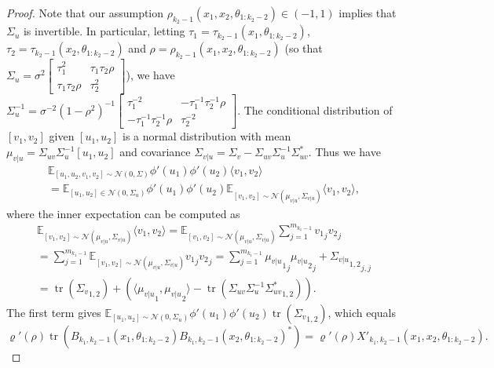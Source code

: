 \documentclass[twoside,11pt]{article}
\newcommand{\E}{\mathbb{E}}
\DeclareMathOperator{\tr}{tr}
\begin{document}
\begin{proof}
Note that our assumption $\rho_{k_2-1}(x_1,x_2,\theta_{1:k_2-2}) \in (-1,1)$ implies that $\Sigma_u$ is invertible. In particular, letting $\tau_1 = \tau_{k_2-1}(x_1, \theta_{1 : k_2-2})$, $\tau_2 = \tau_{k_2-1}(x_2, \theta_{1 : k_2-2})$ and $\rho = \rho_{k_2-1}(x_1,x_2,\theta_{1:k_2-2})$ (so that $\Sigma_u = \sigma^2 \left[ \begin{smallmatrix} \tau_1^2 & \tau_1 \tau_2 \rho \\ \tau_1 \tau_2 \rho & \tau_2^2 \end{smallmatrix} \right]$), we have $\Sigma_u^{-1} = \sigma^{-2} (1-\rho^2)^{-1} \left[ \begin{smallmatrix} \tau_1^{-2} & -\tau_1^{-1} \tau_2^{-1} \rho \\ -\tau_1^{-1} \tau_2^{-1} \rho & \tau_2^{-2} \end{smallmatrix} \right]$. The conditional distribution of $[v_1,v_2]$ given $[u_1,u_2]$ is a normal distribution with mean $\mu_{v \vert u}=\Sigma_{uv} \Sigma_u^{-1} [u_1, u_2]$ and covariance $\Sigma_{v \vert u} = \Sigma_v - \Sigma_{uv} \Sigma_u^{-1} \Sigma_{uv}^*$. Thus we have
\begin{multline*}
\E_{[u_1,u_2,v_1,v_2] \sim \mathcal{N}( 0,\Sigma)} \phi'(u_1) \phi'(u_2) \langle v_1, v_2 \rangle \\
= \E_{[u_1,u_2] \in \mathcal{N}(0,\Sigma_u)}
\phi'(u_1) \phi'(u_2) \E_{[v_1,v_2] \sim \mathcal{N}(\mu_{v \vert u},\Sigma_{v \vert u})}
\langle v_1, v_2 \rangle,
\end{multline*}
where the inner expectation can be computed as
\begin{multline*}
\E_{[v_1,v_2] \sim \mathcal{N}(\mu_{v \vert u}, \Sigma_{v \vert u})}
\langle v_1, v_2 \rangle
 = \E_{[v_1,v_2] \sim \mathcal{N}(\mu_{v \vert u}, \Sigma_{v \vert u})}
\sum_{j=1}^{m_{k_1-1}} {v_1}_j {v_2}_j \\
= \sum_{j=1}^{m_{k_1-1}} \E_{[v_1,v_2] \sim \mathcal{N}(\mu_{v \vert u}, \Sigma_{v \vert u})} {v_1}_j {v_2}_j
= \sum_{j=1}^{m_{k_1-1}} {{\mu_{v \vert u}}_1}_j {{\mu_{v \vert u}}_2}_j + {{\Sigma_{v \vert u}}_{1,2}}_{j,j} \\
= \tr({\Sigma_v}_{1,2}) + (\langle {\mu_{v \vert u}}_1, {\mu_{v \vert u}}_2 \rangle - \tr({\Sigma_{uv} \Sigma_u^{-1} \Sigma_{uv}^*}_{1,2})).
\end{multline*}
The first term gives $\E_{[u_1,u_2] \sim \mathcal{N}( 0,\Sigma_u)} \phi'(u_1)\phi'(u_2) \tr({\Sigma_v}_{1,2})$, which equals
\[
\varrho'(\rho) \tr(B_{k_1,k_2-1}(x_1,\theta_{1:k_2-2}) B_{k_1,k_2-1}(x_2,\theta_{1:k_2-2})^*) = \varrho'(\rho) X'_{k_1,k_2-1}(x_1,x_2,\theta_{1:k_2-2}).
\]


\end{proof}
\end{document}
